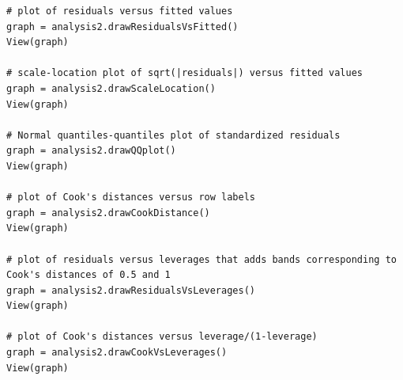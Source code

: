 \begin{lstlisting}[style=pythonStyle]
# plot of residuals versus fitted values
graph = analysis2.drawResidualsVsFitted()
View(graph)

# scale-location plot of sqrt(|residuals|) versus fitted values
graph = analysis2.drawScaleLocation()
View(graph)

# Normal quantiles-quantiles plot of standardized residuals
graph = analysis2.drawQQplot()
View(graph)

# plot of Cook's distances versus row labels
graph = analysis2.drawCookDistance()
View(graph)

# plot of residuals versus leverages that adds bands corresponding to Cook's distances of 0.5 and 1
graph = analysis2.drawResidualsVsLeverages()
View(graph)

# plot of Cook's distances versus leverage/(1-leverage)
graph = analysis2.drawCookVsLeverages()
View(graph)

\end{lstlisting}

